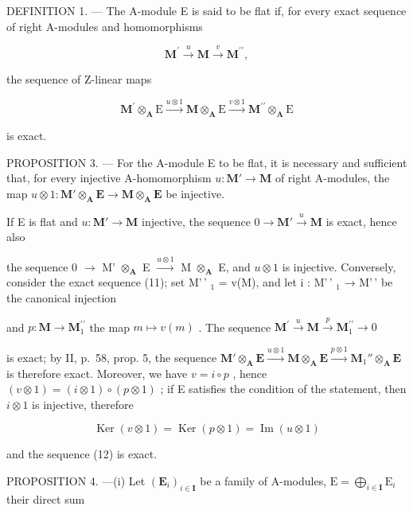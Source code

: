 DEFINITION 1. --- The A-module E is said to be flat if, for every exact sequence of right A-modules and homomorphisms

\[
\mathbf {M} ^ {\prime} \xrightarrow {u} \mathbf {M} \xrightarrow {v} \mathbf {M} ^ {\prime \prime},\tag{11}
\]

the sequence of Z-linear maps

\[
\mathbf {M} ^ {\prime} \otimes_ {\mathbf {A}} \mathrm{E} \xrightarrow {u \otimes 1} \mathbf {M} \otimes_ {\mathbf {A}} \mathrm{E} \xrightarrow {v \otimes 1} \mathbf {M} ^ {\prime \prime} \otimes_ {\mathbf {A}} \mathrm{E}\tag{12}
\]

is exact.

PROPOSITION 3. --- For the A-module E to be flat, it is necessary and sufficient that, for every injective A-homomorphism \(u: \mathbf{M}' \to \mathbf{M}\) of right A-modules, the map \(u \otimes 1: \mathbf{M}' \otimes_{\mathbf{A}} \mathbf{E} \to \mathbf{M} \otimes_{\mathbf{A}} \mathbf{E}\) be injective.

If E is flat and \(u: \mathbf{M}' \to \mathbf{M}\) injective, the sequence \(0 \longrightarrow \mathbf{M}' \stackrel{u}{\longrightarrow} \mathbf{M}\) is exact, hence also

the sequence 0 \(\longrightarrow\) M' \(\otimes_{\mathbf{A}}\) E \(\xrightarrow{u\otimes1}\) M \(\otimes_{\mathbf{A}}\) E, and \(u\otimes1\) is injective. Conversely, consider the exact sequence (11); set M'\,' \(_{1}\) = v(M), and let i : M'\,' \(_{1}\) → M'\,' be the canonical injection

and \(p:\mathbf{M}\to\mathbf{M}_{1}^{\prime\prime}\) the map \(m\mapsto v(m)\) . The sequence \(\mathbf{M}^{\prime}\xrightarrow{u}\mathbf{M}\xrightarrow{p}\mathbf{M}_{1}^{\prime\prime}\longrightarrow0\)

is exact; by II, p.~58, prop. 5, the sequence \(\mathbf{M}' \otimes_{\mathbf{A}} \mathbf{E} \xrightarrow{u \otimes 1} \mathbf{M} \otimes_{\mathbf{A}} \mathbf{E} \xrightarrow{p \otimes 1} \mathbf{M}_{1}'' \otimes_{\mathbf{A}} \mathbf{E}\) is therefore exact. Moreover, we have \(v = i \circ p\) , hence \((v \otimes 1) = (i \otimes 1) \circ (p \otimes 1)\) ; if E satisfies the condition of the statement, then \(i \otimes 1\) is injective, therefore

\[
\operatorname{Ker} (v \otimes 1) = \operatorname{Ker} (p \otimes 1) = \operatorname{Im} (u \otimes 1)
\]

and the sequence (12) is exact.

PROPOSITION 4. ---(i) Let \((\mathbf{E}_i)_{i\in \mathbf{I}}\) be a family of A-modules, \(\mathrm{E} = \bigoplus_{i\in \mathbf{I}}\mathrm{E}_i\) their direct sum

